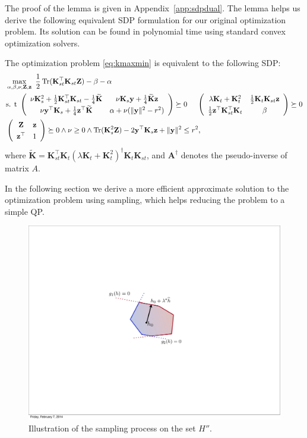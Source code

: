 \documentclass[twoside,11pt]{article}
\DeclareMathOperator{\Tr}{Tr}
\newcommand{\wt}{\widetilde}
\newcommand{\mat}[1]{{\mathbf #1}}
\newcommand{\1}{\mat{1}}
\newcommand{\Ks}{\mat{K}_s}
\newcommand{\Kst}{\mat{K}_{st}}
\newcommand{\Kt}{\mat{K}_{t}}
\newcommand{\y}{\mat{y}}
\newcommand{\z}{\mat{z}}
\newcommand{\Z}{\mat{Z}}
\begin{document}
The proof of the lemma is given in Appendix~\ref{app:sdpdual}. The
lemma helps us derive the following equivalent SDP formulation for our
original optimization problem. Its solution can be found in polynomial
time using standard convex optimization solvers.

\begin{proposition}
\label{prop:cone}
The optimization problem \eqref{eq:kmaxmin} is equivalent to the
following SDP:
\begin{align*}
& \max_{\alpha, \beta, \nu, \Z, \z}  \ \frac{1}{2} \Tr(\Kst^\top \Kst \Z)
- \beta - \alpha\\
& \text{s. t} \ \left(
\def\arraystretch{1.3}
\begin{array}{cc}
\nu \Ks^2 + \frac{1}{2}\Kst^\top \Kst - \frac{1}{4} \wt{\mat K}
& \nu  \Ks \y + \frac{1}{4}\wt{\mat K} \z \\
\nu  \y^\top \Ks + \frac{1}{4} \z^\top \wt{\mat K}
&\alpha + \nu (\|\y\|^2 - r^2)
\end{array}
\right) \succeq 0 \quad  \ \left(
\def\arraystretch{1.3}
\begin{array}{cc}
\lambda \Kt + \Kt^2 & \frac{1}{2} \Kt \Kst \z \\
\frac{1}{2} \z^\top \Kst^\top \Kt & \beta
\end{array}
\right) \succeq 0 \\
&\left(
\begin{array}{cc}
\Z & \z \\
\z^\top & 1
\end{array}
\right) \succeq 0 \wedge \nu \geq 0 \wedge
\Tr(\Ks^2 \Z) - 2\y^\top \Ks \z + \|\y\|^2 \leq r^2,
\end{align*}
where
$\wt{\mat K} = \Kst^\top \Kt (\lambda \Kt + \Kt^2)^\dag \Kt \Kst$, and
$\mat{A}^{\dag}$ denotes the pseudo-inverse of matrix $A$.
\end{proposition}
In the following section we derive a more efficient approximate
solution to the optimization problem using sampling, which helps
reducing the problem to a simple QP.
\begin{figure}[t]
\centering
\includegraphics[scale=.30]{hsampling.pdf}
\caption{Illustration of the sampling process on the set $H''$.}
\label{fig:hsampling}
\end{figure}
\end{document}
